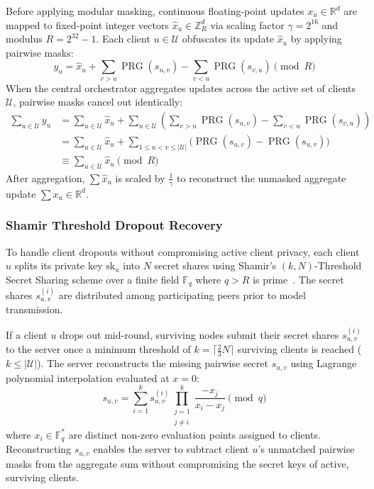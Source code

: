 Before applying modular masking, continuous floating-point updates $x_u \in \mathbb{R}^d$ are mapped to fixed-point integer vectors $\hat{x}_u \in \mathbb{Z}_R^d$ via scaling factor $\gamma = 2^{16}$ and modulus $R = 2^{32} - 1$. Each client $u \in \mathcal{U}$ obfuscates its update $\hat{x}_u$ by applying pairwise masks:
\begin{equation}
    y_u = \hat{x}_u + \sum_{v > u} \operatorname{PRG}(s_{u,v}) - \sum_{v < u} \operatorname{PRG}(s_{v,u}) \pmod R
\end{equation}
When the central orchestrator aggregates updates across the active set of clients $\mathcal{U}$, pairwise masks cancel out identically:
\begin{equation}
\begin{aligned}
    \sum_{u \in \mathcal{U}} y_u &= \sum_{u \in \mathcal{U}} \hat{x}_u + \sum_{u \in \mathcal{U}} \left( \sum_{v > u} \operatorname{PRG}(s_{u,v}) - \sum_{v < u} \operatorname{PRG}(s_{v,u}) \right) \\
    &= \sum_{u \in \mathcal{U}} \hat{x}_u + \sum_{1 \le u < v \le |\mathcal{U}|} \Big( \operatorname{PRG}(s_{u,v}) - \operatorname{PRG}(s_{u,v}) \Big) \\
    &\equiv \sum_{u \in \mathcal{U}} \hat{x}_u \pmod R
\end{aligned}
\end{equation}
After aggregation, $\sum \hat{x}_u$ is scaled by $\frac{1}{\gamma}$ to reconstruct the unmasked aggregate update $\sum x_u \in \mathbb{R}^d$.

\subsubsection{Shamir Threshold Dropout Recovery}
To handle client dropouts without compromising active client privacy, each client $u$ splits its private key $\text{sk}_u$ into $N$ secret shares using Shamir's $(k, N)$-Threshold Secret Sharing scheme over a finite field $\mathbb{F}_q$ where $q > R$ is prime~\cite{bonawitz2017practical}. The secret shares $s_{u,v}^{(i)}$ are distributed among participating peers prior to model transmission.

If a client $u$ drops out mid-round, surviving nodes submit their secret shares $s_{u,v}^{(i)}$ to the server once a minimum threshold of $k = \lceil \frac{2}{3} N \rceil$ surviving clients is reached ($k \le |\mathcal{U}|$). The server reconstructs the missing pairwise secret $s_{u,v}$ using Lagrange polynomial interpolation evaluated at $x = 0$:
\begin{equation}
    s_{u,v} = \sum_{i=1}^{k} s_{u,v}^{(i)} \prod_{\substack{j=1 \\ j \neq i}}^{k} \frac{-x_j}{x_i - x_j} \pmod q
\end{equation}
where $x_i \in \mathbb{F}_q^*$ are distinct non-zero evaluation points assigned to clients. Reconstructing $s_{u,v}$ enables the server to subtract client $u$'s unmatched pairwise masks from the aggregate sum without compromising the secret keys of active, surviving clients.

